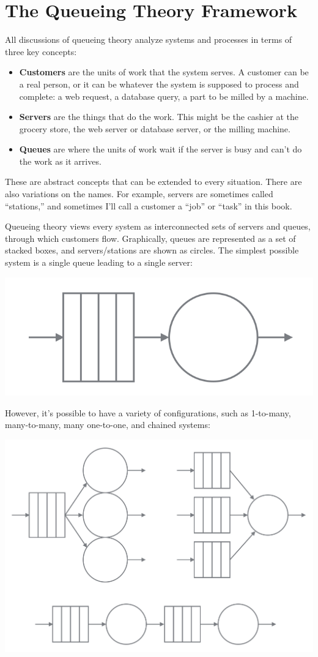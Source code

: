 \documentclass{vivid_layout_pdf}
\begin{document}
\section{The Queueing Theory Framework}

All discussions of queueing theory analyze systems and processes in terms of three key concepts:

\begin{itemize}
\item {\bfseries Customers} are the units of work that the system serves. A customer can be a real person, or it can be whatever the system is supposed to process and complete: a web request, a database query, a part to be milled by a machine.
\item {\bfseries Servers} are the things that do the work. This might be the cashier at the grocery store, the web server or database server, or the milling machine.
\item {\bfseries Queues} are where the units of work wait if the server is busy and can't do the work as it arrives.
\end{itemize}

These are abstract concepts that can be extended to every situation. There are also variations on the names. For example, servers are sometimes called ``stations,'' and sometimes I'll call a customer a ``job'' or ``task'' in this book.

Queueing theory views every system as interconnected sets of servers and queues, through which customers flow. Graphically, queues are represented as a set of stacked boxes, and servers/stations are shown as circles.  The simplest possible system is a single queue leading to a single server:

\begin{center}
\includegraphics[width=.375\linewidth]{queueing-theory/queue-and-server}
\end{center}

However, it's possible to have a variety of configurations, such as 1-to-many, many-to-many, many one-to-one, and chained systems:

\begin{center}
\includegraphics[width=.75\linewidth]{queueing-theory/queue-configurations}
\end{center}
\end{document}
